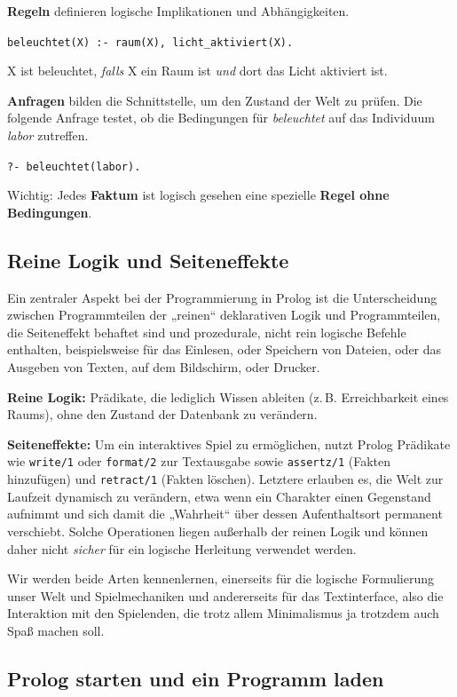 \documentclass[parskip=half,a4paper,11pt]{scrreprt}
\begin{document}
\textbf{Regeln} definieren logische Implikationen und Abhängigkeiten.

\texttt{beleuchtet(X) :- raum(X), licht\_aktiviert(X).}

X ist beleuchtet, \textit{falls} X ein Raum ist \textit{und} dort das Licht aktiviert ist.

\textbf{Anfragen} bilden die Schnittstelle, um den Zustand der Welt zu prüfen. Die folgende Anfrage testet, ob die Bedingungen für \textit{beleuchtet} auf das Individuum \textit{labor} zutreffen.

\texttt{?- beleuchtet(labor).}

Wichtig: Jedes \textbf{Faktum} ist logisch gesehen eine spezielle \textbf{Regel ohne Bedingungen}.

\subsection{Reine Logik und Seiteneffekte}

Ein zentraler Aspekt bei der Programmierung in Prolog ist die Unterscheidung zwischen Programmteilen der „reinen“ deklarativen Logik und Programmteilen, die Seiteneffekt behaftet sind und prozedurale, nicht rein logische Befehle enthalten, beispielsweise für das Einlesen, oder Speichern von Dateien, oder das Ausgeben von Texten, auf dem Bildschirm, oder Drucker.

\textbf{Reine Logik:} Prädikate, die lediglich Wissen ableiten (z.\,B. Erreichbarkeit eines Raums), ohne den Zustand der Datenbank zu verändern.

\textbf{Seiteneffekte:} Um ein interaktives Spiel zu ermöglichen, nutzt Prolog Prädikate wie \texttt{write/1} oder \texttt{format/2} zur Textausgabe sowie \texttt{assertz/1} (Fakten hinzufügen) und \texttt{retract/1} (Fakten löschen). Letztere erlauben es, die Welt zur Laufzeit dynamisch zu verändern, etwa wenn ein Charakter einen Gegenstand aufnimmt und sich damit die „Wahrheit“ über dessen Aufenthaltsort permanent verschiebt. Solche Operationen liegen außerhalb der reinen Logik und können daher nicht\textit{ sicher }für ein logische Herleitung verwendet werden. 

Wir werden beide Arten kennenlernen, einerseits für die logische Formulierung unser Welt und Spielmechaniken und andererseits für das Textinterface, also die Interaktion mit den Spielenden, die trotz allem Minimalismus ja trotzdem auch Spaß machen soll.

\subsection{Prolog starten und ein Programm laden}
\end{document}
